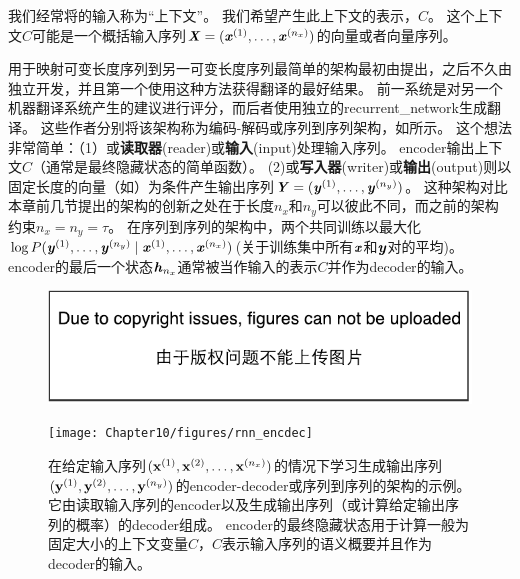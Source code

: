 我们经常将的输入称为``上下文''。
我们希望产生此上下文的表示，$C$。
这个上下文$C$可能是一个概括输入序列$\boldsymbol{\mathit{X}}=(\boldsymbol{\mathit{x}}^{(1)},\dots,\boldsymbol{\mathit{x}}^{(n_x)})$的向量或者向量序列。

用于映射可变长度序列到另一可变长度序列最简单的架构最初由\cite{cho-al-emnlp14}提出，之后不久由\cite{Sutskever-et-al-NIPS2014}独立开发，并且第一个使用这种方法获得翻译的最好结果。
前一系统是对另一个机器翻译系统产生的建议进行评分，而后者使用独立的\gls{recurrent_network}生成翻译。
这些作者分别将该架构称为编码-解码或序列到序列架构，如所示。
这个想法非常简单：（1）或\textbf{读取器}(reader)或\textbf{输入}(input)处理输入序列。
\gls{encoder}输出上下文$C$（通常是最终隐藏状态的简单函数）。
(2)或\textbf{写入器}(writer)或\textbf{输出}(output)则以固定长度的向量（如）为条件产生输出序列$\boldsymbol{\mathit{Y}}=(\boldsymbol{\mathit{y}}^{(1)}, \dots, \boldsymbol{\mathit{y}}^{(n_y)})$。
这种架构对比本章前几节提出的架构的创新之处在于长度$n_x$和$n_y$可以彼此不同，而之前的架构约束$n_x = n_y = \tau$。
在序列到序列的架构中，两个共同训练以最大化$\log P( \boldsymbol{\mathit{y}}^{(1)}, \dots, \boldsymbol{\mathit{y}}^{(n_y)} \mid \boldsymbol{\mathit{x}}^{(1)},\dots,\boldsymbol{\mathit{x}}^{(n_x)} )$(关于训练集中所有$\boldsymbol{\mathit{x}}$和$\boldsymbol{\mathit{y}}$对的平均)。
\gls{encoder}的最后一个状态$\boldsymbol{\mathit{h}}_{n_x}$通常被当作输入的表示$C$并作为\gls{decoder}的输入。

\begin{figure}[!htb]
\ifOpenSource
\centerline{\includegraphics{figure.pdf}}
\else
\centerline{\texttt{[image: Chapter10/figures/rnn\_encdec]}}
\fi
\caption{在给定输入序列$(\mathbf{x}^{(1)},\mathbf{x}^{(2)},\dots,\mathbf{x}^{(n_x)})$的情况下学习生成输出序列$(\mathbf{y}^{(1)},\mathbf{y}^{(2)},\dots,\mathbf{y}^{(n_y)})$的\gls{encoder}-\gls{decoder}或序列到序列的架构的示例。 
它由读取输入序列的\gls{encoder}以及生成输出序列（或计算给定输出序列的概率）的\gls{decoder}组成。
\gls{encoder}的最终隐藏状态用于计算一般为固定大小的上下文变量$C$，$C$表示输入序列的语义概要并且作为\gls{decoder}的输入。
}
\label{fig:chap10_rnn_encdec}
\end{figure}

